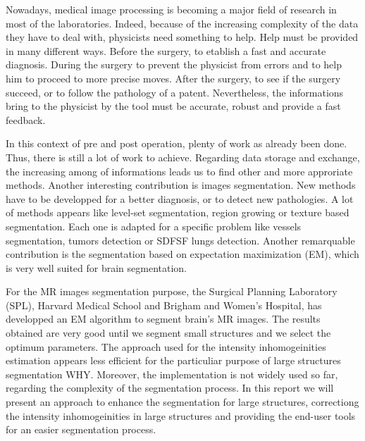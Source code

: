 Nowadays, medical image processing is becoming a major field of research in most of the laboratories. Indeed, because of the increasing complexity of the data they have to deal with,  physicists need something to help. Help must be provided in many different ways. Before the surgery, to etablish a fast and accurate diagnosis. During the surgery to prevent the physicist from errors and to help him to proceed to more precise moves. After the surgery, to see if the surgery succeed, or to follow the pathology of a patent. Nevertheless, the informations bring to the physicist by the tool must be accurate, robust and provide a fast feedback.
%
\par
%
In this context of pre and post operation, plenty of work as already been done. Thus, there is still a lot of work to achieve. Regarding data storage and exchange, the increasing among of informations leads us to find other and more approriate methods. Another interesting contribution is images segmentation. New methods have to be developped for a better diagnosis, or to detect new pathologies. A lot of methods appears like level-set segmentation, region growing or texture based segmentation. Each one is adapted for a specific problem like vessels segmentation, tumors detection or SDFSF lungs detection. Another remarquable contribution is the segmentation based on expectation maximization (EM), which is very well suited for brain segmentation. 
%
\par
%
For the MR images segmentation purpose, the Surgical Planning Laboratory (SPL), Harvard Medical School and Brigham and Women's Hospital, has developped an EM algorithm to segment brain's MR images. The results obtained are very good until we segment small structures and we select the optimum parameters. The approach used for the intensity inhomogeinities estimation appears less efficient for the particuliar purpose of large structures segmentation WHY. Moreover, the implementation is not widely used so far, regarding the complexity of the segmentation process. In this report we will present an approach to enhance the segmentation for large structures, correctiong the intensity inhomogeinities in large structures and providing the end-user tools for an easier segmentation process.
%

